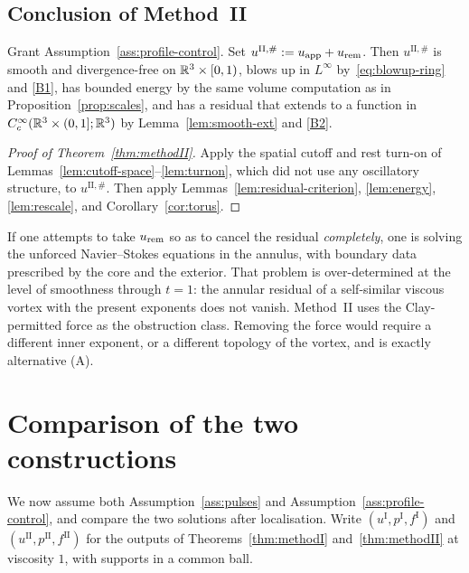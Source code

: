 \subsection{Conclusion of Method~II}

\begin{proposition}
\label{prop:prelocal-II}
Grant Assumption~\ref{ass:profile-control}. Set $u^{\mathrm{II},\#}:=u_{\mathrm{app}}+u_{\mathrm{rem}}$. Then $u^{\mathrm{II},\#}$ is smooth and divergence-free on $\mathbb{R}^3\times[0,1)$, blows up in $L^\infty$ by~\eqref{eq:blowup-ring} and \ref{B1}, has bounded energy by the same volume computation as in Proposition~\ref{prop:scales}, and has a residual that extends to a function in $C_c^\infty(\mathbb{R}^3\times(0,1];\mathbb{R}^3)$ by Lemma~\ref{lem:smooth-ext} and \ref{B2}.
\end{proposition}

\begin{proof}[Proof of Theorem~\ref{thm:methodII}]
Apply the spatial cutoff and rest turn-on of Lemmas~\ref{lem:cutoff-space}--\ref{lem:turnon}, which did not use any oscillatory structure, to $u^{\mathrm{II},\#}$. Then apply Lemmas~\ref{lem:residual-criterion}, \ref{lem:energy}, \ref{lem:rescale}, and Corollary~\ref{cor:torus}.
\end{proof}

\begin{remark}
If one attempts to take $u_{\mathrm{rem}}$ so as to cancel the residual \emph{completely}, one is solving the unforced {N}avier--{S}tokes equations in the annulus, with boundary data prescribed by the core and the exterior. That problem is over-determined at the level of smoothness through $t=1$: the annular residual of a self-similar viscous vortex with the present exponents does not vanish. Method~II uses the {C}lay-permitted force as the obstruction class. Removing the force would require a different inner exponent, or a different topology of the vortex, and is exactly alternative (A).
\end{remark}

\section{Comparison of the two constructions}
\label{sec:comparison}

We now assume both Assumption~\ref{ass:pulses} and Assumption~\ref{ass:profile-control}, and compare the two solutions after localisation. Write $(u^{\mathrm I},p^{\mathrm I},f^{\mathrm I})$ and $(u^{\mathrm{II}},p^{\mathrm{II}},f^{\mathrm{II}})$ for the outputs of Theorems~\ref{thm:methodI} and~\ref{thm:methodII} at viscosity $1$, with supports in a common ball.

